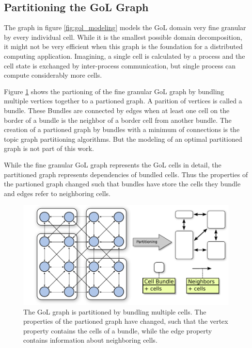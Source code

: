 \subsection{Partitioning the GoL Graph}
The graph in figure \ref{fig:gol_modeling} models the GoL domain very fine
granular by every individual cell. While it is the smallest possible
domain decomposition, it might not be very efficient when this graph
is the foundation for a distributed computing application. Imagining, a
single cell is calculated by a process and the cell state is exchanged
by inter-process communication, but single process can compute
considerably more cells.

Figure \ref{fig:gol_bundle} shows the partioning of the fine granular
GoL graph by bundling multiple vertices together to a partioned
graph. A parition of vertices is called a bundle. These Bundles are
connected by edges when at least one cell on the border of a bundle
is the neighbor of a border cell from another bundle.  The creation of
a partioned graph by bundles with a minimum of connections is the
topic graph partitioning algorithms. But the modeling of an optimal
partitioned graph is not part of this work.

While the fine granular GoL graph represents the GoL cells in detail, the
partitioned graph represents dependencies of bundled cells. Thus
the properties of the partioned graph changed such that bundles
have store the cells they bundle and edges refer to neighboring
cells.

\begin{figure}[H]
  \centering \includegraphics[width=\textwidth]{graphics/30_gol_bundle}
  \caption{The GoL graph is partitioned by bundling multiple
    cells. The properties of the partioned graph have changed, such
    that the vertex property contains the cells of a bundle, while the
    edge property contains information about neighboring cells.}
  \label{fig:gol_bundle}
\end{figure}

